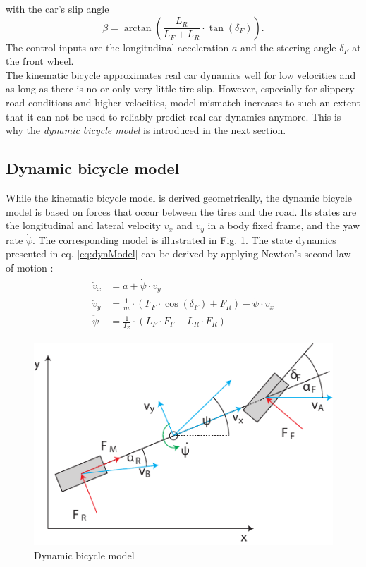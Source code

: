 with the car's slip angle
\begin{equation}
    \beta = \arctan\left(\frac{L_R}{L_F+L_R}\cdot \tan(\delta_F)\right).
\end{equation}
The control inputs are the longitudinal acceleration $a$ and the steering angle $\delta_F$ at the front wheel.\\
The kinematic bicycle approximates real car dynamics well for low velocities and as long as there is no or only very little tire slip. However, especially for slippery road conditions and higher velocities, model mismatch increases to such an extent that it can not be used to reliably predict real car dynamics anymore. This is why the \emph{dynamic bicycle model} is introduced in the next section.

\subsection{Dynamic bicycle model}
While the kinematic bicycle model is derived geometrically, the dynamic bicycle model is based on forces that occur between the tires and the road. Its states are the longitudinal and lateral velocity $v_x$ and $v_y$ in a body fixed frame, and the yaw rate $\dot \psi$. The corresponding model is illustrated in Fig. \ref{fig:dynModel}. The state dynamics presented in eq. \eqref{eq:dynModel} can be derived by applying Newton's second law of motion \cite{Kong2015}: %
\begin{align}
\begin{split}
\label{eq:dynModel}
    \dot v_x &= a+\dot \psi\cdot v_y\\
    \dot v_y &= \frac{1}{m}\cdot (F_F\cdot \cos(\delta_F)+F_R)-\dot\psi\cdot v_x\\
    \ddot \psi &= \frac{1}{I_Z}\cdot(L_F\cdot F_F - L_R\cdot F_R)
\end{split}
\end{align}
\begin{figure}[ht]
	\centering
  	\includegraphics{../../Figures/Models/DynModel.pdf}
	\caption{Dynamic bicycle model}
	\label{fig:dynModel}
\end{figure}
